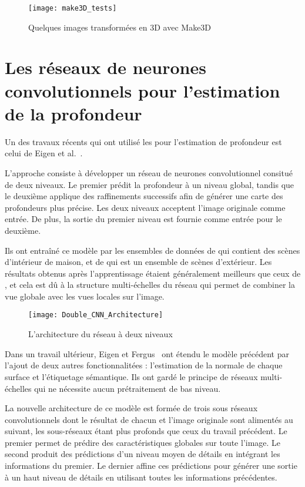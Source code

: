 \begin{figure}[H]
\texttt{[image: make3D\_tests]}
\caption{Quelques images transformées en 3D avec Make3D}{\cite{saxena2005learning}}
\end{figure}

\section{Les réseaux de neurones convolutionnels pour l'estimation de la profondeur}

Un des travaux récents qui ont utilisé les 
pour l'estimation de profondeur est celui de Eigen et al.~\cite{eigen2014depth}.

L'approche consiste à développer un réseau de neurones convolutionnel consitué de
deux niveaux. Le premier prédit la profondeur à un niveau global, tandis que le
deuxième applique des raffinements successifs afin de générer une carte des
profondeurs plus précise. Les deux niveaux acceptent l'image originale comme
entrée. De plus, la sortie du premier niveau est fournie comme entrée pour
le deuxième.

Ils ont entraîné ce modèle par les ensembles de données de  qui
contient des scènes d'intérieur de maison, et de  qui est un ensemble
de scènes d'extérieur. Les résultats obtenus après l'apprentissage étaient
généralement meilleurs que ceux de , et cela est dû à la
structure multi-échelles du réseau qui permet de combiner la vue globale avec les
vues locales sur l'image.

\begin{figure}[H]
\begin{center}
\texttt{[image: Double\_CNN\_Architecture]}
\caption{L'architecture du réseau à deux niveaux}{\cite{eigen2014depth}}
\end{center}
\end{figure}

\vspace{-1em}

Dans un travail ultérieur, Eigen et Fergus~\cite{eigen2015predicting} ont étendu
le modèle précédent par l'ajout de deux autres fonctionnalitées : l'estimation
de la normale de chaque surface et l'étiquetage sémantique. Ils ont gardé le
principe de réseaux multi-échelles qui ne nécessite aucun prétraitement de bas
niveau.

La nouvelle architecture de ce modèle est formée de trois sous réseaux
convolutionnels dont le résultat de chacun et l'image originale sont alimentés
au suivant, les sous-réseaux étant plus profonds que ceux du travail précédent.
Le premier permet de prédire des caractéristiques globales sur toute l'image.
Le second produit des prédictions d'un niveau moyen de détails en intégrant les
informations du premier. Le dernier affine ces prédictions pour générer une
sortie à un haut niveau de détails en utilisant toutes les informations précédentes.

